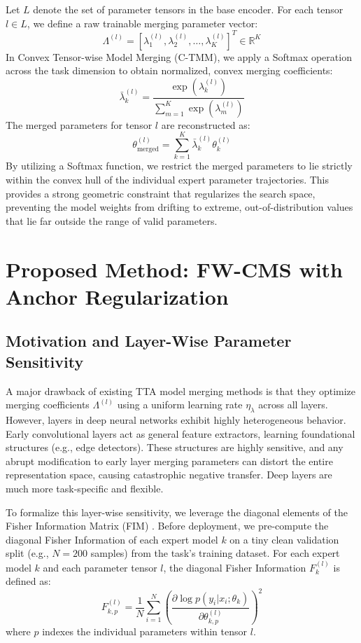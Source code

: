\documentclass{article}
\begin{document}
Let $L$ denote the set of parameter tensors in the base encoder. For each tensor $l \in L$, we define a raw trainable merging parameter vector:
\begin{equation}
    \Lambda^{(l)} = [\lambda_1^{(l)}, \lambda_2^{(l)}, \dots, \lambda_K^{(l)}]^T \in \mathbb{R}^K
\end{equation}
In Convex Tensor-wise Model Merging (C-TMM), we apply a Softmax operation across the task dimension to obtain normalized, convex merging coefficients:
\begin{equation}
    \bar{\lambda}_k^{(l)} = \frac{\exp(\lambda_k^{(l)})}{\sum_{m=1}^K \exp(\lambda_m^{(l)})}
\end{equation}
The merged parameters for tensor $l$ are reconstructed as:
\begin{equation}
    \theta_{\text{merged}}^{(l)} = \sum_{k=1}^K \bar{\lambda}_k^{(l)} \theta_k^{(l)}
\end{equation}
By utilizing a Softmax function, we restrict the merged parameters to lie strictly within the convex hull of the individual expert parameter trajectories. This provides a strong geometric constraint that regularizes the search space, preventing the model weights from drifting to extreme, out-of-distribution values that lie far outside the range of valid parameters.

\section{Proposed Method: FW-CMS with Anchor Regularization}
\label{sec:method}
\subsection{Motivation and Layer-Wise Parameter Sensitivity}
A major drawback of existing TTA model merging methods is that they optimize merging coefficients $\Lambda^{(l)}$ using a uniform learning rate $\eta_{\lambda}$ across all layers. However, layers in deep neural networks exhibit highly heterogeneous behavior. Early convolutional layers act as general feature extractors, learning foundational structures (e.g., edge detectors). These structures are highly sensitive, and any abrupt modification to early layer merging parameters can distort the entire representation space, causing catastrophic negative transfer. Deep layers are much more task-specific and flexible.

To formalize this layer-wise sensitivity, we leverage the diagonal elements of the Fisher Information Matrix (FIM) \cite{kirkpatrick2017overcoming, matena2021merging}. Before deployment, we pre-compute the diagonal Fisher Information of each expert model $k$ on a tiny clean validation split (e.g., $N=200$ samples) from the task's training dataset. For each expert model $k$ and each parameter tensor $l$, the diagonal Fisher Information $F_{k}^{(l)}$ is defined as:
\begin{equation}
    F_{k,p}^{(l)} = \frac{1}{N} \sum_{i=1}^N \left( \frac{\partial \log p(y_i|x_i; \theta_k)}{\partial \theta_{k,p}^{(l)}} \right)^2
\end{equation}
where $p$ indexes the individual parameters within tensor $l$.
\end{document}
